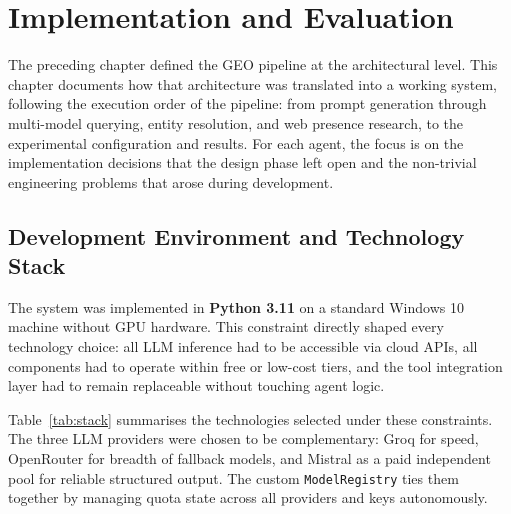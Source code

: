 \chapter{Implementation and Evaluation}
\label{chap:impl}

The preceding chapter defined the GEO pipeline at the architectural level.
This chapter documents how that architecture was translated into a working system,
following the execution order of the pipeline: from prompt generation through
multi-model querying, entity resolution, and web presence research, to the
experimental configuration and results. For each agent, the focus is on the
implementation decisions that the design phase left open and the non-trivial
engineering problems that arose during development.

\section{Development Environment and Technology Stack}
\label{sec:devenv}

The system was implemented in \textbf{Python 3.11} on a standard Windows 10 machine
without GPU hardware. This constraint directly shaped every technology choice:
all LLM inference had to be accessible via cloud APIs, all components had to operate
within free or low-cost tiers, and the tool integration layer had to remain
replaceable without touching agent logic.

Table~\ref{tab:stack} summarises the technologies selected under these constraints.
The three LLM providers were chosen to be complementary: Groq for speed,
OpenRouter for breadth of fallback models, and Mistral as a paid independent pool
for reliable structured output. The custom \texttt{ModelRegistry} ties them together
by managing quota state across all providers and keys autonomously.

